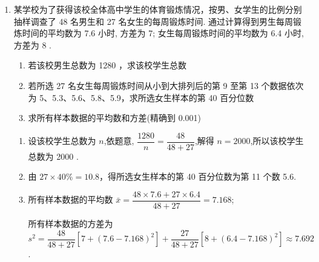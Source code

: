 \begin{enumerate}
\begin{jieda}
\begin{enumerate}
            所以 ${10} - x = 2 \Rightarrow  x = 8$， $n = {100} - {32} - {13} - {11} - 4 = {40}$.
            
            又因为 ${100} \times  {0.4} = {40}$,
            
            所以样本的第 40 百分位数为: $\dfrac{8 + {8.5}}{2} = {8.25}$(小时).
        \end{enumerate}
    \end{jieda}

    \item 某学校为了获得该校全体高中学生的体育锻炼情况，按男、女学生的比例分别抽样调查了 48 名男生和 27 名女生的每周锻炼时间. 通过计算得到男生每周锻炼时间的平均数为 7.6 小时, 方差为 7; 女生每周锻炼时间的平均数为 6.4 小时, 方差为 8 .
    \begin{enumerate}
        \item 若该校男生总数为 1280 ，求该校学生总数
        \item 若所选 27 名女生每周锻炼时间从小到大排列后的第 9 至第 13 个数据依次为 5、5.3、5.6、5.8、5.9，求所选女生样本的第 40 百分位数
        \item 求所有样本数据的平均数和方差(精确到 0.001)
    \end{enumerate}
    \begin{jieda}
        \begin{enumerate}
            \item 设该校学生总数为 $n$,依题意, $\dfrac{1280}{n} = \dfrac{48}{{48} + {27}}$,解得 $n = {2000}$,所以该校学生总数为 2000 .
            \item 由 ${27} \times  {40}\%  = {10.8}$，得所选女生样本的第 40 百分位数为第 11 个数 5.6.
            \item 所有样本数据的平均数 $\bar{x} = \dfrac{{48} \times  {7.6} + {27} \times  {6.4}}{{48} + {27}} = {7.168}$;
            
            所有样本数据的方差为 ${s}^{2} = \dfrac{48}{{48} + {27}}\left\lbrack  {7 + {\left( {7.6} - {7.168}\right) }^{2}}\right\rbrack   + \dfrac{27}{{48} + {27}}\left\lbrack  {8 + {\left( {6.4} - {7.168}\right) }^{2}}\right\rbrack   \approx  {7.692}$.
        \end{enumerate}
    \end{jieda}
\end{enumerate}